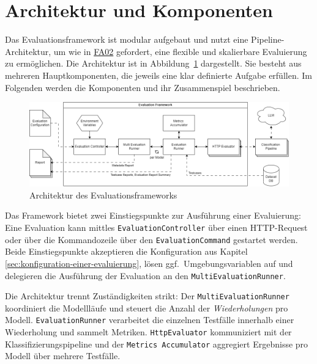 \section{Architektur und Komponenten}\label{sec:architektur-und-komponenten}

Das Evaluationsframework ist modular aufgebaut und nutzt eine Pipeline-Architektur, um wie in \hyperlink{FA02}{FA02} gefordert, eine flexible und skalierbare Evaluierung zu ermöglichen. Die Architektur ist in Abbildung~\ref{fig:evaluation-framework-architecture} dargestellt. Sie besteht aus mehreren Hauptkomponenten, die jeweils eine klar definierte Aufgabe erfüllen. Im Folgenden werden die Komponenten und ihr Zusammenspiel beschrieben.

\begin{figure}[h]
    \centering
    \includegraphics[width=\linewidth]{images/evaluation/evaluation-framework-architecture.drawio}
    \caption{Architektur des Evaluationsframeworks}
    \label{fig:evaluation-framework-architecture}
\end{figure}

Das Framework bietet zwei Einstiegspunkte zur Ausführung einer Evaluierung: Eine Evaluation kann mittles \texttt{EvaluationController} über einen HTTP-Request oder über die Kommandozeile über den \texttt{EvaluationCommand} gestartet werden. Beide Einstiegspunkte akzeptieren die Konfiguration aus Kapitel \ref{sec:konfiguration-einer-evaluierung}, lösen ggf.\ Umgebungsvariablen auf und delegieren die Ausführung der Evaluation an den \texttt{MultiEvaluationRunner}.

Die Architektur trennt Zuständigkeiten strikt: Der \texttt{MultiEvaluationRunner} koordiniert die Modellläufe und steuert die Anzahl der \emph{Wiederholungen} pro Modell. \texttt{EvaluationRunner} verarbeitet die einzelnen Testfälle innerhalb einer Wiederholung und sammelt Metriken. \texttt{HttpEvaluator} kommuniziert mit der Klassifizierungspipeline und der \texttt{Metrics Accumulator} aggregiert Ergebnisse pro Modell über mehrere Testfälle.